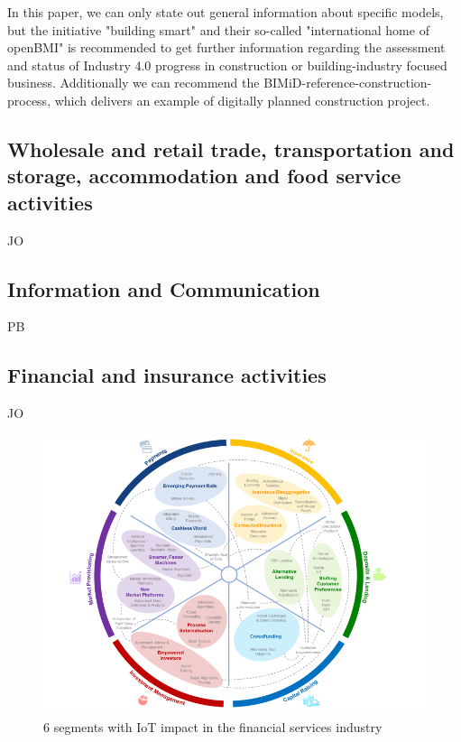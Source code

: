 In this paper, we can only state out general information about specific models, but the initiative "building smart" %
and their so-called "international home of openBMI" is recommended to get further information regarding the assessment and status of Industry 4.0 progress in construction or building-industry focused business. Additionally we can recommend the BIMiD-reference-construction-process, which delivers an example of digitally planned construction project. %

   


\subsection{Wholesale and retail trade, transportation and storage, accommodation and food service activities}
JO

\subsection{Information and Communication}
PB

\subsection{Financial and insurance activities}
JO

\begin{figure}[H]
\centering
\includegraphics[width=1\columnwidth]{images/industry-financial-services-6segments_wef-copyright.PNG}
\caption{6 segments with IoT impact in the financial services industry}
\end{figure}


